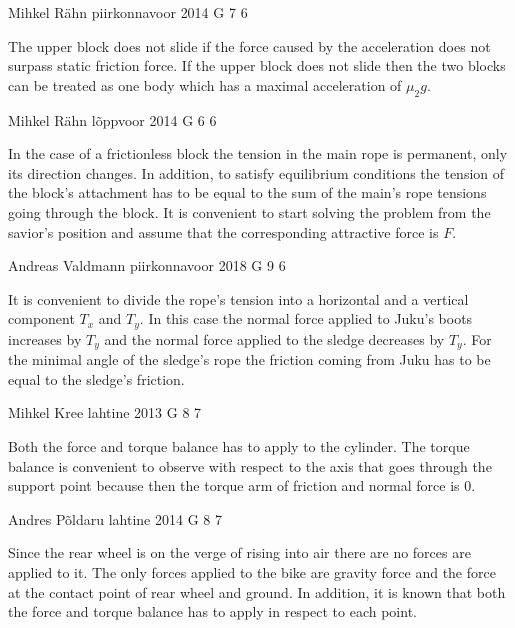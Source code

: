 \documentclass[11pt]{article}
\begin{document}
{Mihkel Rähn} %
{piirkonnavoor} %
{2014} %
{G 7} %
{6} %
{

\ifEngHint
The upper block does not slide if the force caused by the acceleration does not surpass static friction force. If the upper block does not slide then the two blocks can be treated as one body which has a maximal acceleration of $\mu_2g$.
\fi
}

{Mihkel Rähn} %
{lõppvoor} %
{2014} %
{G 6} %
{6} %
{

\ifEngHint
In the case of a frictionless block the tension in the main rope is permanent, only its direction changes. In addition, to satisfy equilibrium conditions the tension of the block’s attachment has to be equal to the sum of the main’s rope tensions going through the block. It is convenient to start solving the problem from the savior’s position and assume that the corresponding attractive force is $F$.
\fi
}

{Andreas Valdmann} %
{piirkonnavoor} %
{2018} %
{G 9} %
{6} %
{

\ifEngHint
It is convenient to divide the rope’s tension into a horizontal and a vertical component $T_x$ and $T_y$. In this case the normal force applied to Juku’s boots increases by $T_y$ and the normal force applied to the sledge decreases by $T_y$. For the minimal angle of the sledge’s rope the friction coming from Juku has to be equal to the sledge’s friction.
\fi
}

{Mihkel Kree} %
{lahtine} %
{2013} %
{G 8} %
{7} %
{

\ifEngHint
Both the force and torque balance has to apply to the cylinder. The torque balance is convenient to observe with respect to the axis that goes through the support point because then the torque arm of friction and normal force is 0.
\fi
}

{Andres Põldaru} %
{lahtine} %
{2014} %
{G 8} %
{7} %
{

\ifEngHint
Since the rear wheel is on the verge of rising into air there are no forces are applied to it. The only forces applied to the bike are gravity force and the force at the contact point of rear wheel and ground. In addition, it is known that both the force and torque balance has to apply in respect to each point.
\fi
}
\end{document}
